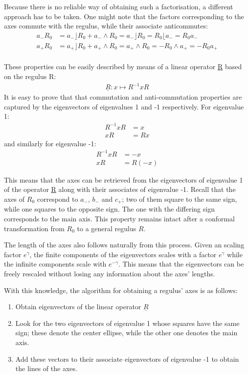 \documentclass[a4paper, 10pt]{article}
\begin{document}
Because there is no reliable way of obtaining such a factorisation, a different
approach has to be taken. One might note that the factors corresponding to the
axes commute with the regulus, while their associate anticommutes:
\begin{align*}
  a_- R_0 &= a_- \rfloor R_0 + a_- \wedge R_0 = a_- \rfloor R_0 =  R_0 \lfloor a_- = R_0 a_- \\
  a_+ R_0 &= a_+ \rfloor R_0 + a_+ \wedge R_0 = a_+ \wedge R_0 = -R_0 \wedge a_+ = -R_0 a_+ \\
\end{align*}

These properties can be easily described by means of a linear operator
\underline{R} based on the regulus R\cite{dorst2013versors}:
\begin{align*}
  \underline{R} : x \mapsto R^{-1} x R
\end{align*}
It is easy to prove that that commutation and anti-commutation properties are
captured by the eigenvectors of eigenvalues 1 and -1 respectively.
For eigenvalue 1:
\begin{align*}
  R^{-1} x R &= x \\
  x R &= R x
\end{align*}
and similarly for eigenvalue -1:
\begin{align*}
  R^{-1} x R &= -x \\
  x R &= R (-x)
\end{align*}

This means that the axes can be retrieved from the eigenvectors of eigenvalue 1 of
the operator \underline{R} along with their associates of eigenvalue -1. Recall
that the axes of $R_0$ correspond to $a_-$, $b_-$ and $c_+$; two of them square
to the same sign, while one squares to the opposite sign. The one with the
differing sign corresponds to the main axis. This property remains intact
after a conformal transformation from $R_0$ to a general regulus $R$.

The length of the axes also follows naturally from this process. Given an
scaling factor $e^\gamma$, the finite components of the eigenvectors scales with
a factor $e^\gamma$ while the infinite components scale with
$e^{-\gamma}$\cite{dorst2013versors}. This
means that the eigenvectors can be freely rescaled without losing any
information about the axes' lengths.

With this knowledge, the algorithm for obtaining a regulus' axes is as follows:
\begin{enumerate}
  \item Obtain eigenvectors of the linear operator $\underline{R}$
  \item Look for the two eigenvectors of eigenvalue 1 whose squares have the
    same sign; these denote the center ellipse, while the other one denotes the
    main axis.
  \item Add these vectors to their associate eigenvectors of eigenvalue -1 to
    obtain the lines of the axes.
\end{enumerate}
\end{document}
